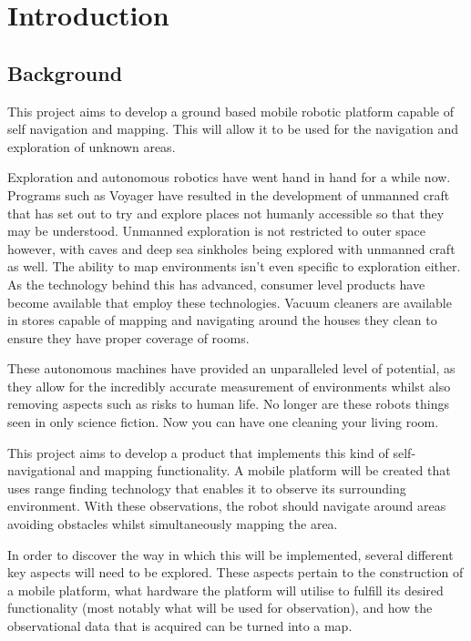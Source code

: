 \chapter{Introduction}\label{introduction}
	\section{Background}
	This project aims to develop a ground based mobile robotic platform capable of self navigation and mapping. This will allow it to be used for the navigation and exploration of unknown areas.
	
	Exploration and autonomous robotics have went hand in hand for a while now. Programs such as Voyager have resulted in the development of unmanned craft that has set out to try and explore places not humanly accessible so that they may be understood. Unmanned exploration is not restricted to outer space however, with caves\citep{mcfarlane2013integrated} and deep sea sinkholes\citep{carnegie2007sinkhole} being explored with unmanned craft as well. The ability to map environments isn't even specific to exploration either. As the technology behind this has advanced, consumer level products have become available that employ these technologies. Vacuum cleaners are available in stores capable of mapping and navigating around the houses they clean to ensure they have proper coverage of rooms.
	
	These autonomous machines have provided an unparalleled level of potential, as they allow for the incredibly accurate measurement of environments whilst also removing aspects such as risks to human life. No longer are these robots things seen in only science fiction. Now you can have one cleaning your living room.
	
	This project aims to develop a product that implements this kind of self-navigational and mapping functionality. A mobile platform will be created that uses range finding technology that enables it to observe its surrounding environment. With these observations, the robot should navigate around areas avoiding obstacles whilst simultaneously mapping the area.
	
	In order to discover the way in which this will be implemented, several different key aspects will need to be explored. These aspects pertain to the construction of a mobile platform, what hardware the platform will utilise to fulfill its desired functionality (most notably what will be used for observation), and how the observational data that is acquired can be turned into a map.

